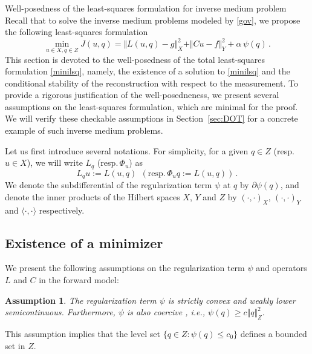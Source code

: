 \documentclass[11pt]{article}%
\renewcommand{\_}{{\fontfamily{ptm}\selectfont\textunderscore}}
\theoremstyle{plain}
\numberwithin{equation}{section}
\newtheorem{assumption}{Assumption}
\def\ra{\rangle} \def\la{\langle}
\begin{document}
\begin{section}{Well-posedness of the least-squares formulation for inverse medium problem}\label{sec:well}
Recall that to solve the inverse medium problems modeled by \eqref{gov}, we propose the following least-squares formulation
\begin{equation}\label{minilsq}
\min_{u\in X, q\in Z} J(u,q) =\Vert L(u,q)- g\Vert_{X}^2+\Vert Cu-f\Vert_{Y}^2+\alpha\,\psi(q)\, .
\end{equation}
This section is devoted to the well-posedness of the total least-squares formulation \eqref{minilsq}, namely, the existence of a solution to \eqref{minilsq} and the conditional stability of the reconstruction with respect to the measurement. 
 To provide a rigorous justification of the well-posedneness, we present several assumptions on the least-squares formulation, which are minimal for the proof.
 We will verify these checkable assumptions in Section~\ref{sec:DOT} for a concrete example of such inverse medium problems.

 Let us first introduce several notations.
For simplicity, for a given $q\in Z$ (resp.\,$u\in X$), we will write $L_q$ (resp.\,$\Phi_u$) as 
 \begin{equation}
L_q u:=L(u,q) ~~(\mbox{resp.}\,\Phi_u q:=L(u,q))\,. \label{notLq} 
\end{equation}
We denote the subdifferential of the regularization term $\psi$ at $q$ by $\partial \psi(q)$, and denote the inner products of the Hilbert spaces $X$, $Y$ and $Z$ by
$(\cdot,\cdot)_X$, $(\cdot,\cdot)_Y$ and $\la \cdot, \cdot\ra$ respectively. 

\subsection{Existence of a minimizer}
We present the following assumptions on the regularization term $\psi$ and operators $L$ and $C$ in the forward model:

\begin{assumption}\label{assum1}
The regularization term $\psi$ is strictly convex and weakly lower semicontinuous.
Furthermore, $\psi$ is also coercive \cite{ito2015inverse}, i.e., $\psi(q)\geq c\Vert q\Vert^2_Z$.
\end{assumption}
This assumption implies that the level set $\{q\in Z:\psi(q)\leq c_0\}$ defines a bounded set in $Z$.


\end{section}
\end{document}
